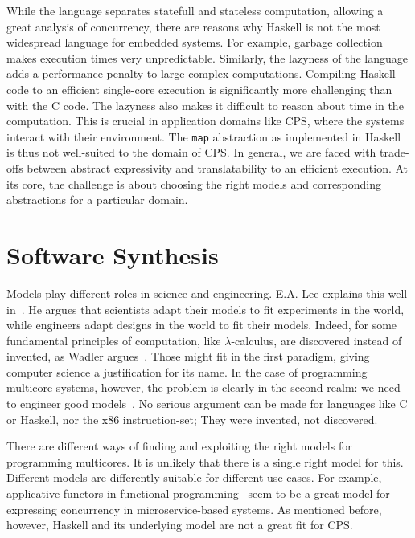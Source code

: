 While the language separates statefull and stateless computation, allowing a great analysis of concurrency, there are reasons why Haskell is not the most widespread language for embedded systems.
For example, garbage collection makes execution times very unpredictable.
Similarly, the lazyness of the language adds a performance penalty to large complex computations.
Compiling Haskell code to an efficient single-core execution is significantly more challenging than with the C code.
The lazyness also makes it difficult to reason about time in the computation.
This is crucial in application domains like \ac{CPS}, where the systems interact with their environment.
The \texttt{map} abstraction as implemented in Haskell is thus not well-suited to the domain of \ac{CPS}.
In general, we are faced with trade-offs between abstract expressivity and translatability to an efficient execution.
At its core, the challenge is about choosing the right models and corresponding abstractions for a particular domain.

\section{Software Synthesis}

Models play different roles in science and engineering.
E.A. Lee explains this well in~\cite{lee2017plato}.
He argues that scientists adapt their models to fit experiments in the world, while engineers adapt designs in the world to fit their models.
Indeed, for some fundamental principles of computation, like $\lambda$-calculus, are discovered instead of invented, as Wadler argues~\cite{wadler2015propositions}.
Those might fit in the first paradigm, giving computer science a justification for its name.
In the case of programming multicore systems, however, the problem is clearly in the second realm: we need to engineer good models~\cite{lee2006problem}.
No serious argument can be made for languages like C or Haskell, nor the x86 instruction-set; They were invented, not discovered.

There are different ways of finding and exploiting the right models for programming multicores.
It is unlikely that there is a single right model for this.
Different models are differently suitable for different use-cases. 
For example, applicative functors in functional programming~\cite{marlow2014haxl} seem to be a great model for expressing  concurrency in microservice-based systems.
As mentioned before, however, Haskell and its underlying model are not a great fit for \ac{CPS}.

